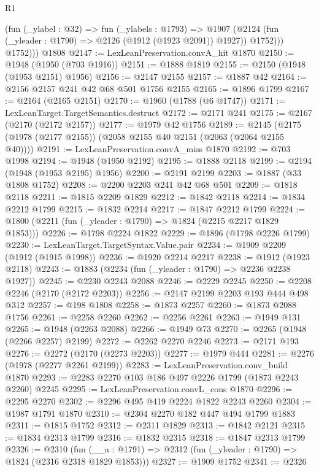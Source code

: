 \begin{lexlean}{R1}
\begin{coremodule}
{{{{{{{{{{{{{{{{{{{{{{{{{{{{{{{{{{{{{{{{{{{{{{{{{{            (fun (_ylabel : @32) =>
            fun (_ylabels : @1793) =>
            @1907 (@2124 (fun (_yleader : @1790) => @2126 (@1912 (@1923 @2091)) @1927)) @1752)))
          @1752)))
    @1808
@2147 := LexLeanPreservation.convA_hit @1870
@2150 := @1948 (@1950 (@703 @1916))
@2151 := @1888 @1819
@2155 := @2150 (@1948 (@1953 @2151) @1956)
@2156 := @2147 @2155
@2157 := @1887 @42
@2164 := @2156 @2157 @241 @42 @68 @501 @1756 @2155
@2165 := @1896 @1799
@2167 := @2164 (@2165 @2151)
@2170 := @1960 (@1788 (@6 @1747))
@2171 := LexLeanTarget.TargetSemantics.destruct
@2172 := @2171 @241
@2175 := @2167 (@2170 (@2172 @2157))
@2177 := @1979 @42 @1756
@2189 := @2145 (@2175 (@1978 (@2177 @2155)) (@2058 @2155 @40 @2151 (@2063 (@2064 @2155 @40))))
@2191 := LexLeanPreservation.convA_miss @1870
@2192 := @703 @1998
@2194 := @1948 (@1950 @2192)
@2195 := @1888 @2118
@2199 := @2194 (@1948 (@1953 @2195) @1956)
@2200 := @2191 @2199
@2203 := @1887 (@33 @1808 @1752)
@2208 := @2200 @2203 @241 @42 @68 @501
@2209 := @1818 @2118
@2211 := @1815 @2209 @1829
@2212 := @1842 @2118
@2214 := @1834 @2212 @1799
@2215 := @1832 @2214
@2217 := @1847 @2212 @1799
@2224 := @1800 (@2211 (fun (_yleader : @1790) => @1824 (@2215 @2217 @1829 @1853)))
@2226 := @1798 @2224 @1822
@2229 := @1896 (@1798 @2226 @1799)
@2230 := LexLeanTarget.TargetSyntax.Value.pair
@2234 := @1909 @2209 (@1912 (@1915 @1998))
@2236 := @1920 @2214 @2217
@2238 := @1912 (@1923 @2118)
@2243 := @1883 (@2234 (fun (_yleader : @1790) => @2236 @2238 @1927))
@2245 := @2230 @2243 @2088
@2246 := @2229 @2245
@2250 := @2208 @2246 (@2170 (@2172 @2203))
@2256 := @2147 @2199 @2203 @193 @444 @498 @312
@2257 := @198 @1808
@2258 := @1873 @2257
@2260 := @1873 @2088 @1756
@2261 := @2258 @2260
@2262 := @2256 @2261
@2263 := @1949 @131
@2265 := @1948 (@2263 @2088)
@2266 := @1949 @73
@2270 := @2265 (@1948 (@2266 @2257) @2199)
@2272 := @2262 @2270 @2246
@2273 := @2171 @193
@2276 := @2272 (@2170 (@2273 @2203))
@2277 := @1979 @444
@2281 := @2276 (@1978 (@2277 @2261 @2199))
@2283 := LexLeanPreservation.conv_build @1870
@2293 := @2283 @2270 @103 @186 @497 @2226 @1799 (@1873 @2243 @2260) @2245
@2295 := LexLeanPreservation.convL_cons @1870
@2296 := @2295 @2270
@2302 := @2296 @495 @419 @2224 @1822 @2243 @2260
@2304 := @1987 @1791 @1870
@2310 := @2304 @2270 @182 @447 @494 @1799 @1883
@2311 := @1815 @1752
@2312 := @2311 @1829
@2313 := @1842 @2121
@2315 := @1834 @2313 @1799
@2316 := @1832 @2315
@2318 := @1847 @2313 @1799
@2326 := @2310
    (fun (__a : @1791) => @2312 (fun (_yleader : @1790) => @1824 (@2316 @2318 @1829 @1853)))
@2327 := @1909 @1752
@2341 := @2326
}}}}}}}}}}}}}}}}}}}}}}}}}}}}}}}}}}}}}}}}}}}}}}}}}}
\end{coremodule}
\end{lexlean}
